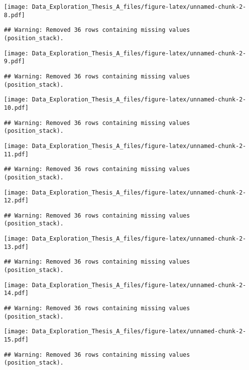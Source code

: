\documentclass[]{article}
\begin{document}
\texttt{[image: Data\_Exploration\_Thesis\_A\_files/figure-latex/unnamed-chunk-2-8.pdf]}

\begin{verbatim}
## Warning: Removed 36 rows containing missing values (position_stack).
\end{verbatim}

\texttt{[image: Data\_Exploration\_Thesis\_A\_files/figure-latex/unnamed-chunk-2-9.pdf]}

\begin{verbatim}
## Warning: Removed 36 rows containing missing values (position_stack).
\end{verbatim}

\texttt{[image: Data\_Exploration\_Thesis\_A\_files/figure-latex/unnamed-chunk-2-10.pdf]}

\begin{verbatim}
## Warning: Removed 36 rows containing missing values (position_stack).
\end{verbatim}

\texttt{[image: Data\_Exploration\_Thesis\_A\_files/figure-latex/unnamed-chunk-2-11.pdf]}

\begin{verbatim}
## Warning: Removed 36 rows containing missing values (position_stack).
\end{verbatim}

\texttt{[image: Data\_Exploration\_Thesis\_A\_files/figure-latex/unnamed-chunk-2-12.pdf]}

\begin{verbatim}
## Warning: Removed 36 rows containing missing values (position_stack).
\end{verbatim}

\texttt{[image: Data\_Exploration\_Thesis\_A\_files/figure-latex/unnamed-chunk-2-13.pdf]}

\begin{verbatim}
## Warning: Removed 36 rows containing missing values (position_stack).
\end{verbatim}

\texttt{[image: Data\_Exploration\_Thesis\_A\_files/figure-latex/unnamed-chunk-2-14.pdf]}

\begin{verbatim}
## Warning: Removed 36 rows containing missing values (position_stack).
\end{verbatim}

\texttt{[image: Data\_Exploration\_Thesis\_A\_files/figure-latex/unnamed-chunk-2-15.pdf]}

\begin{verbatim}
## Warning: Removed 36 rows containing missing values (position_stack).
\end{verbatim}
\end{document}
